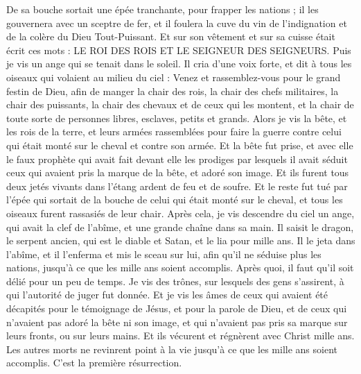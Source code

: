 \begin{multicols}{2}
De sa bouche sortait une épée tranchante, pour frapper les nations ; il les gouvernera avec un sceptre de fer, et il foulera la cuve du vin de l'indignation et de la colère du Dieu Tout-Puissant.
Et sur son vêtement et sur sa cuisse était écrit ces mots : LE ROI DES ROIS ET LE SEIGNEUR DES SEIGNEURS.
Puis je vis un ange qui se tenait dans le soleil. Il cria d'une voix forte, et dit à tous les oiseaux qui volaient au milieu du ciel : Venez et rassemblez-vous pour le grand festin de Dieu,
afin de manger la chair des rois, la chair des chefs militaires, la chair des puissants, la chair des chevaux et de ceux qui les montent, et la chair de toute sorte de personnes libres, esclaves, petits et grands.
Alors je vis la bête, et les rois de la terre, et leurs armées rassemblées pour faire la guerre contre celui qui était monté sur le cheval et contre son armée.
Et la bête fut prise, et avec elle le faux prophète qui avait fait devant elle les prodiges par lesquels il avait séduit ceux qui avaient pris la marque de la bête, et adoré son image. Et ils furent tous deux jetés vivants dans l'étang ardent de feu et de soufre.
Et le reste fut tué par l'épée qui sortait de la bouche de celui qui était monté sur le cheval, et tous les oiseaux furent rassasiés de leur chair.
\VerseOne{}Après cela, je vis descendre du ciel un ange, qui avait la clef de l'abîme, et une grande chaîne dans sa main.
Il saisit le dragon, le serpent ancien, qui est le diable et Satan, et le lia pour mille ans.
Il le jeta dans l'abîme, et il l'enferma et mis le sceau sur lui, afin qu'il ne séduise plus les nations, jusqu'à ce que les mille ans soient accomplis. Après quoi, il faut qu'il soit délié pour un peu de temps.
Je vis des trônes, sur lesquels des gens s'assirent, à qui l'autorité de juger fut donnée. Et je vis les âmes de ceux qui avaient été décapités pour le témoignage de Jésus, et pour la parole de Dieu, et de ceux qui n'avaient pas adoré la bête ni son image, et qui n'avaient pas pris sa marque sur leurs fronts, ou sur leurs mains. Et ils vécurent et régnèrent avec Christ mille ans.
Les autres morts ne revinrent point à la vie jusqu'à ce que les mille ans soient accomplis. C'est la première résurrection.

\end{multicols}
